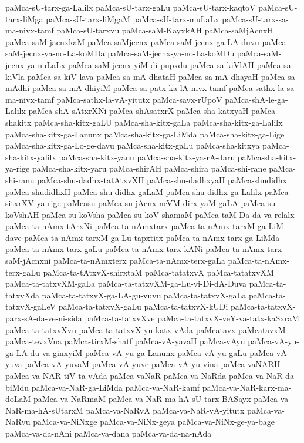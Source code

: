 {paMca-sU-tarx-ga-Lalilx
paMca-sU-tarx-gaLu
paMca-sU-tarx-kaqtoV
paMca-sU-tarx-liMga
paMca-sU-tarx-liMgaM
paMca-sU-tarx-muLaLx
paMca-sU-tarx-sa-ma-nivx-tamf
paMca-sU-tarxvu
paMca-saM-KayxkAH
paMca-saMjAcnxH
paMca-saM-jacnxkaM
paMca-saMjecnx
paMca-saM-jecnx-ga-LA-duvu
paMca-saM-jecnx-ya-no-La-koMDa
paMca-saM-jecnx-ya-no-La-koMDu
paMca-saM-jecnx-ya-nuLaLx
paMca-saM-jecnx-yiM-di-pupxdu
paMca-sa-kiVlAH
paMca-sa-kiVla
paMca-sa-kiV-lava
paMca-sa-mA-dhataH
paMca-sa-mA-dhayaH
paMca-sa-mAdhi
paMca-sa-mA-dhiyiM
paMca-sa-patx-ka-lA-nivx-tamf
paMca-sathx-la-sa-ma-nivx-tamf
paMca-sathx-la-vA-yitutx
paMca-savx-rUpoV
paMca-shA-le-ga-Lalilx
paMca-shA-sAtxrXNi
paMca-shAsatxrX
paMca-sha-katxyaH
paMca-shakitx
paMca-sha-kitx-gaLU
paMca-sha-kitx-gaLa
paMca-sha-kitx-ga-Lalilx
paMca-sha-kitx-ga-Lanunx
paMca-sha-kitx-ga-LiMda
paMca-sha-kitx-ga-Lige
paMca-sha-kitx-ga-Lo-ge-davu
paMca-sha-kitx-gaLu
paMca-sha-kitxya
paMca-sha-kitx-yalilx
paMca-sha-kitx-yanu
paMca-sha-kitx-ya-rA-daru
paMca-sha-kitx-ya-rige
paMca-sha-kitx-yaru
paMca-shirAH
paMca-shira
paMca-shi-rane
paMca-shi-ranu
paMca-shu-dadhx-tatAtxvXH
paMca-shu-dadhxyaH
paMca-shudidhx
paMca-shudidhxH
paMca-shu-didhx-gaLaM
paMca-shu-didhx-ga-Lalilx
paMca-sitxrXV-ya-rige
paMcasu
paMca-su-jAcnx-neVM-dirx-yaM-gaLA
paMca-su-koVshAH
paMca-su-koVsha
paMca-su-koV-shamaM
paMca-taM-Da-da-va-relalx
paMca-ta-nAmx-tArxNi
paMca-ta-nAmxtarx
paMca-ta-nAmx-tarxM-ga-LiM-dave
paMca-ta-nAmx-tarxM-ga-Lu-tapxtitx
paMca-ta-nAmx-tarx-ga-LiMda
paMca-ta-nAmx-tarx-gaLu
paMca-ta-nAmx-tarx-kANi
paMca-ta-nAmx-tarx-saM-jAcnxni
paMca-ta-nAmxterx
paMca-ta-nAmx-terx-gaLa
paMca-ta-nAmx-terx-gaLu
paMca-ta-tAtxvX-shirxtaM
paMca-tatatxvX
paMca-tatatxvXM
paMca-ta-tatxvXM-gaLa
paMca-ta-tatxvXM-ga-Lu-vi-Di-dA-Duva
paMca-ta-tatxvXda
paMca-ta-tatxvX-ga-LA-gu-vuvu
paMca-ta-tatxvX-gaLa
paMca-ta-tatxvX-gaLeV
paMca-ta-tatxvX-gaLu
paMca-ta-tatxvX-kUDi
paMca-ta-tatxvX-parx-sA-da-ve-ni-sida
paMca-ta-tatxvXve
paMca-ta-tatxvX-veY-va-tatx-kaSxraM
paMca-ta-tatxvXvu
paMca-ta-tatxvX-yu-katx-vAda
paMcatavx
paMcatavxM
paMca-tevxVna
paMca-tirxM-shatf
paMca-vA-yavaH
paMca-vAyu
paMca-vA-yu-ga-LA-du-va-ginxyiM
paMca-vA-yu-ga-Lanunx
paMca-vA-yu-gaLu
paMca-vA-yuva
paMca-vA-yuvaM
paMca-vA-yuve
paMca-vA-yu-vina
paMca-vaNARH
paMca-va-NAR-tiV-ta-vAda
paMca-vaNaR
paMca-va-NaRda
paMca-va-NaR-da-biMdu
paMca-va-NaR-ga-LiMda
paMca-va-NaR-kamf
paMca-va-NaR-karx-ma-doLaM
paMca-va-NaRmaM
paMca-va-NaR-ma-hA-sU-tarx-BASayx
paMca-va-NaR-ma-hA-sUtarxM
paMca-va-NaRvA
paMca-va-NaR-vA-yitutx
paMca-va-NaRvu
paMca-va-NiNxge
paMca-va-NiNx-geya
paMca-va-NiNx-ge-ya-bage
paMca-va-da-nAni
paMca-va-dana
paMca-va-da-na-nAda
}
